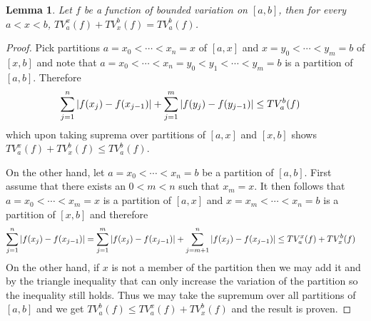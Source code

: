 \documentclass{amsart}
\newtheorem{lem}[thm]{Lemma}
\theoremstyle{remark}
\theoremstyle{definition}
\begin{document}
\begin{lem}\label{AdditivityOfTotalVariation}Let $f$ be a function of
  bounded variation on $[a,b]$, then for every $a < x < b$, $TV_a^x(f)
  + TV_x^b(f) = TV_a^b(f)$.
\end{lem}
\begin{proof}Pick partitions $a=x_0 < \dotsb < x_n=x$ of $[a,x]$ and $x=y_0 <
  \dotsb < y_m=b$ of $[x,b]$ and note that $a=x_0 < \dotsb < x_n=y_0 < y_1 < \dotsb <
  y_m=b$ is a partition of $[a,b]$.  Therefore
\begin{align*}
\sum_{j=1}^n \left \vert f(x_j) - f(x_{j-1}) \right \vert + \sum_{j=1}^m \left \vert f(y_j) -
  f(y_{j-1}) \right \vert &\leq TV_a^b(f)
\end{align*}
which upon taking suprema over partitions of $[a,x]$ and $[x,b]$ shows
$TV_a^x(f) + TV_x^b(f) \leq TV_a^b(f)$.  

On the other hand, let $a=x_0 < \dotsb < x_n=b$ be a partition of
$[a,b]$.  First assume that there exists an $0 < m < n$ such that $x_m
= x$.  It then follows that $a=x_0 < \dotsb < x_m=x$ is a partition of
$[a,x]$ and $x = x_m < \dotsb < x_n=b$ is a partition of $[x,b]$ and
therefore
\begin{align*}
\sum_{j=1}^n \left \vert f(x_j) - f(x_{j-1}) \right \vert &= \sum_{j=1}^m \left \vert f(x_j) -
  f(x_{j-1}) \right \vert + \sum_{j=m+1}^n \left \vert f(x_j) - f(x_{j-1}) \right \vert \leq
TV_a^x(f)  + TV_x^b(f)
\end{align*}
On the other hand, if $x$ is not a member of the partition then we may
add it and by the triangle inequality that can only increase the
variation of the partition so the inequality still holds.  Thus we may
take the supremum over all partitions of $[a,b]$ and we get $TV_a^b(f)
\leq TV_a^x(f)  + TV_x^b(f)$ and the result is proven.
\end{proof}
\end{document}
